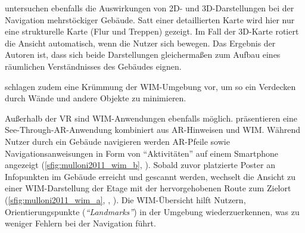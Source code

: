 \textcite{Li2013} untersuchen ebenfalls die Auswirkungen von 2D- und 3D-Dar\-stel\-lun\-gen bei der Navigation mehrstöckiger Gebäude.
Satt einer detaillierten Karte wird hier nur eine strukturelle Karte (Flur und Treppen) gezeigt.
Im Fall der 3D-Karte rotiert die Ansicht automatisch, wenn die Nutzer sich bewegen.
Das Ergebnis der Autoren ist, dass sich beide Darstellungen gleichermaßen zum Aufbau eines räumlichen Verständnisses des Gebäudes eignen.

\textcite{Vallance2001} schlagen zudem eine Krümmung der WIM-Umgebung vor, um so ein Verdecken durch Wände und andere Objekte zu minimieren.

Außerhalb der VR sind WIM-Anwendungen ebenfalls möglich.
\textcites{Mulloni2011a}{Mulloni2012} präsentieren eine See-Through-AR-Anwendung kombiniert aus AR-Hinweisen und WIM.
Während Nutzer durch ein Gebäude navigieren werden AR-Pfeile sowie Navigationsanweisungen in Form von \enquote{Aktivitäten} auf einem Smartphone angezeigt (\autoref{sfig:mulloni2011_wim_b}, ).
Sobald zuvor platzierte Poster an Infopunkten im Gebäude erreicht und gescannt werden, wechselt die Ansicht zu einer WIM-Darstellung der Etage mit der hervorgehobenen Route zum Zielort (\autoref{sfig:mulloni2011_wim_a}, , ).
Die WIM-Übersicht hilft Nutzern, Orientierungspunkte (\emph{\enquote{Landmarks}}) in der Umgebung wiederzuerkennen, was zu weniger Fehlern bei der Navigation führt.

